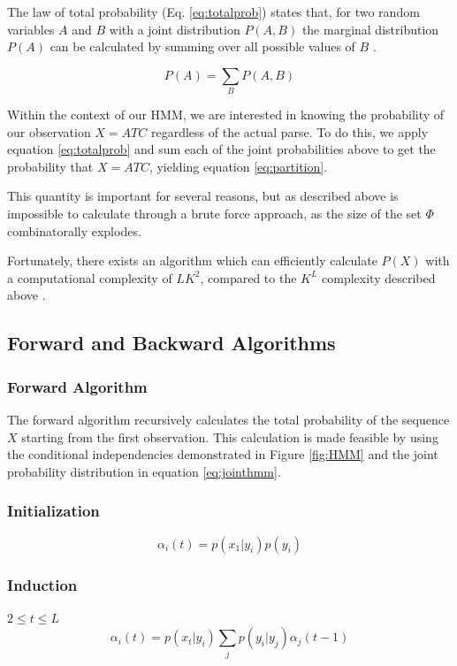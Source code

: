 The law of total probability (Eq. \ref{eq:totalprob}) states that, for two random variables $A$ and $B$ with a joint distribution $P(A,B)$ the marginal distribution $P(A)$ can be calculated by summing over all possible values of $B$ \cite{Brookes1951FoundationsProbability}.

\begin{equation}
    P(A) = \sum_B{P(A,B)}
\label{eq:totalprob}
\end{equation}

Within the context of our HMM, we are interested in knowing the probability of our observation $X=ATC$ regardless of the actual parse. To do this, we apply equation \ref{eq:totalprob} and sum each of the joint probabilities above to get the probability that $X=ATC$, yielding equation \ref{eq:partition}.

This quantity is important for several reasons, but as described above is impossible to calculate through a brute force approach, as the size of the set $\Phi$ combinatorally explodes.

Fortunately, there exists an algorithm which can efficiently calculate $P(X)$ with a computational complexity of $LK^2$, compared to the $K^L$ complexity described above \cite{Rabiner1989ARecognition}.
\subsection{Forward and Backward Algorithms}
\subsubsection{Forward Algorithm}
The forward algorithm recursively calculates the total probability of the sequence $X$ starting from the first observation. This calculation is made feasible by using the conditional independencies demonstrated in Figure \ref{fig:HMM} and the joint probability distribution in equation \ref{eq:jointhmm}.

\subsubsection{Initialization}
\begin{equation}
    \alpha_i(t) = p(x_1|y_i)p(y_i)
\label{eq:fwdinit}
\end{equation}

\subsubsection{Induction}
$2\leq t\leq L$
\begin{equation}
    \alpha_i(t) =p(x_t|y_i)\sum_{j}{p(y_i|y_j)\alpha_j(t-1)}
\label{eq:fwdinduc}
\end{equation}

